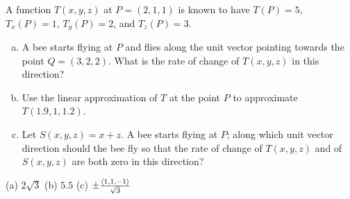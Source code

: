 \begin{question}[M200 2015D] %
A function $T(x,y,z)$ at $P = (2,1,1)$ is known to have 
$T(P) = 5$, $T_x (P) = 1$, $T_y(P) = 2$, and $T_z(P) = 3$.
\begin{enumerate}[(a)]
\item
A bee starts flying at $P$ and flies along the unit vector pointing 
towards the point $Q = (3,2,2)$. What is the rate of change of 
$T(x,y,z)$ in this direction?
\item
Use the linear approximation of $T$ at the point $P$ to approximate 
$T(1.9,1,1.2)$.
\item
Let $S(x,y,z) = x + z$. A bee starts flying at $P$; along which unit 
vector direction should the bee fly so that the rate of change of $T(x,y,z)$ 
and of $S(x,y,z)$ are both zero in this direction?
\end{enumerate}
\end{question}

%

\begin{answer}
(a) $2\sqrt{3}$ \qquad
(b) $5.5$\qquad
(c) $\pm\frac{\left< 1,1,-1\right>}{\sqrt{3}}$
\end{answer}

